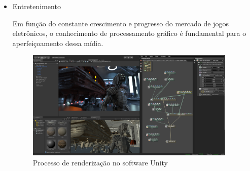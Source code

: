 \documentclass{article}
\begin{document}
\begin{itemize}
    \item Entretenimento
    
    Em função do constante crescimento e progresso do mercado de jogos eletrônicos, o conhecimento de processamento gráfico é fundamental para o aperfeiçoamento dessa mídia. 
    
    \begin{figure}[H]
        \centering
        \includegraphics[width=100mm,scale=0.5]{images/pngegg.png}
        \caption{Processo de renderização no software Unity}
        \label{fig:render}
    \end{figure}
    
\end{itemize}

\printbibliography
\end{document}
